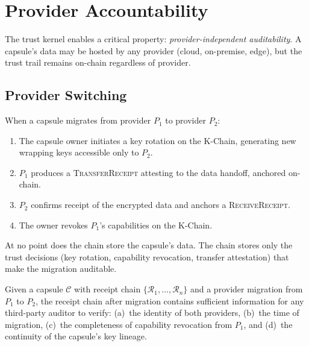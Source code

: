 \section{Provider Accountability}
\label{sec:provider}

The trust kernel enables a critical property: \emph{provider-independent
auditability}. A capsule's data may be hosted by any provider (cloud, on-premise,
edge), but the trust trail remains on-chain regardless of provider.

\subsection{Provider Switching}

When a capsule migrates from provider $P_1$ to provider $P_2$:

\begin{enumerate}
    \item The capsule owner initiates a key rotation on the K-Chain, generating
          new wrapping keys accessible only to $P_2$.
    \item $P_1$ produces a \textsc{TransferReceipt} attesting to the data
          handoff, anchored on-chain.
    \item $P_2$ confirms receipt of the encrypted data and anchors a
          \textsc{ReceiveReceipt}.
    \item The owner revokes $P_1$'s capabilities on the K-Chain.
\end{enumerate}

At no point does the chain store the capsule's data. The chain stores only the
trust decisions (key rotation, capability revocation, transfer attestation) that
make the migration auditable.

\begin{proposition}\label{prop:provider}
Given a capsule $\mathcal{C}$ with receipt chain $\{\mathcal{R}_1, \ldots,
\mathcal{R}_n\}$ and a provider migration from $P_1$ to $P_2$, the receipt
chain after migration contains sufficient information for any third-party
auditor to verify: (a)~the identity of both providers, (b)~the time of
migration, (c)~the completeness of capability revocation from $P_1$, and
(d)~the continuity of the capsule's key lineage.
\end{proposition}

